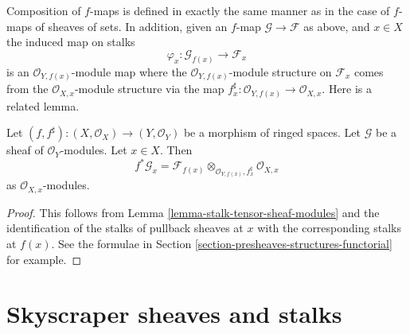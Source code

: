 \medskip\noindent
Composition of $f$-maps is defined in exactly the
same manner as in the case of $f$-maps of sheaves of
sets. In addition, given an $f$-map $\mathcal{G} \to \mathcal{F}$
as above, and $x \in X$ the induced map on stalks
$$
\varphi_x : \mathcal{G}_{f(x)} \longrightarrow \mathcal{F}_x
$$
is an $\mathcal{O}_{Y, f(x)}$-module map where the
$\mathcal{O}_{Y, f(x)}$-module structure on $\mathcal{F}_x$
comes from the $\mathcal{O}_{X, x}$-module structure via
the map $f^\sharp_x : \mathcal{O}_{Y, f(x)} \to \mathcal{O}_{X, x}$.
Here is a related lemma.

\begin{lemma}
\label{lemma-stalk-pullback-modules}
Let $(f, f^\sharp) : (X, \mathcal{O}_X) \to (Y, \mathcal{O}_Y)$
be a morphism of ringed spaces.
Let $\mathcal{G}$ be a sheaf of $\mathcal{O}_Y$-modules.
Let $x \in X$. Then
$$
f^*\mathcal{G}_x =
\mathcal{F}_{f(x)}
\otimes_{\mathcal{O}_{Y, f(x)}, f^\sharp_x}
\mathcal{O}_{X, x}
$$
as $\mathcal{O}_{X, x}$-modules.
\end{lemma}

\begin{proof}
This follows from Lemma \ref{lemma-stalk-tensor-sheaf-modules}
and the identification of the stalks of pullback sheaves
at $x$ with the corresponding stalks at $f(x)$. See the
formulae in Section \ref{section-presheaves-structures-functorial}
for example.
\end{proof}



\section{Skyscraper sheaves and stalks}
\label{section-skyscraper-sheaves}

